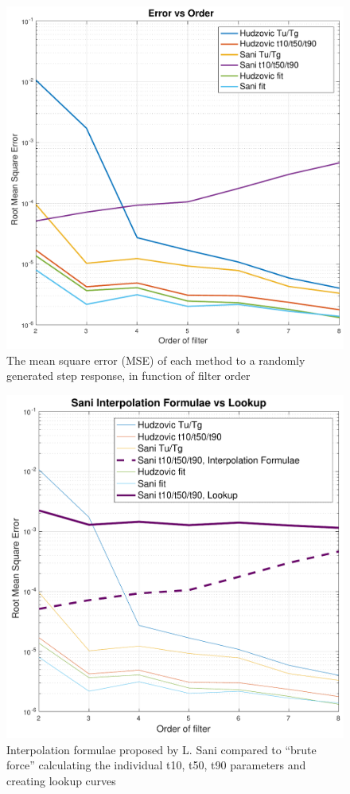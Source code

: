 \begin{figure}
    \includegraphics[width=\linewidth]{images/error_order}
    \caption{The mean square error (MSE) of each method to a randomly generated step response, in function of filter order}
    \label{fig:error_order}
\end{figure}
\begin{figure}
    \includegraphics[width=\linewidth]{images/sani_interpolation_vs_lookup}
    \caption{Interpolation formulae proposed by L. Sani compared to ``brute force'' calculating the individual t10, t50, t90 parameters and creating lookup curves}
    \label{fig:interpolation_vs_lookup}
\end{figure}

